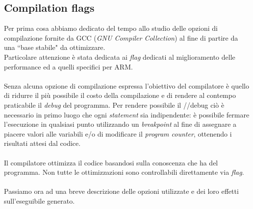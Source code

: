 
\subsection{Compilation flags}
Per prima cosa abbiamo dedicato del tempo allo studio delle opzioni di 
compilazione fornite da GCC (\emph{GNU Compiler Collection}) al fine di partire 
da una ``base stabile" da ottimizzare.\\
Particolare attenzione è stata dedicata ai \emph{flag} dedicati al 
miglioramento delle performance ed a quelli specifici per ARM.\\
\\
Senza alcuna opzione di compilazione espressa l'obiettivo del compilatore è 
quello di ridurre il più possibile il costo della compilazione e di rendere al 
contempo praticabile il \emph{debug} del programma. Per rendere possibile il 
//debug ciò è necessario in primo luogo che ogni \emph{statement} sia 
indipendente: è possibile fermare l'esecuzione in qualsiasi punto utilizzando 
un \emph{breakpoint} al fine di assegnare a piacere valori alle variabili e/o 
di modificare il \emph{program counter}, ottenendo i risultati attesi dal 
codice.\\
\\
Il compilatore ottimizza il codice basandosi sulla conoscenza che ha del 
programma. Non tutte le ottimizzazioni sono controllabili direttamente via 
\emph{flag}.\\
\\
Passiamo ora ad una breve descrizione delle opzioni utilizzate e dei loro 
effetti sull'eseguibile generato.

